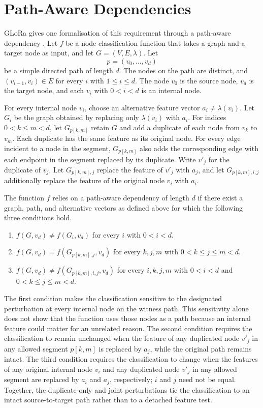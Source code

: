 \section{Path-Aware Dependencies}

GLoRa gives one formalisation of this requirement through a path-aware dependency \cite{zhou2025glora}.
Let \(f\) be a node-classification function that takes a graph and a target node as input, and let \(G=(V,E,\lambda)\).
Let
\[
p=(v_0,\ldots,v_d)
\]
be a simple directed path of length \(d\).
The nodes on the path are distinct, and \((v_{i-1},v_i)\in E\) for every \(i\) with \(1\leq i\leq d\).
The node \(v_0\) is the source node, \(v_d\) is the target node, and each \(v_i\) with \(0<i<d\) is an internal node.

For every internal node \(v_i\), choose an alternative feature vector \(a_i\neq\lambda(v_i)\).
Let \(G_i\) be the graph obtained by replacing only \(\lambda(v_i)\) with \(a_i\).
For indices \(0<k\leq m<d\), let \(G_{p[k,m]}\) retain \(G\) and add a duplicate of each node from \(v_k\) to \(v_m\).
Each duplicate has the same feature as its original node.
For every edge incident to a node in the segment, \(G_{p[k,m]}\) also adds the corresponding edge with each endpoint in the segment replaced by its duplicate.
Write \(v'_j\) for the duplicate of \(v_j\).
Let \(G_{p[k,m],j}\) replace the feature of \(v'_j\) with \(a_j\), and let \(G_{p[k,m],i,j}\) additionally replace the feature of the original node \(v_i\) with \(a_i\).

The function \(f\) relies on a path-aware dependency of length \(d\) if there exist a graph, path, and alternative vectors as defined above for which the following three conditions hold.
\begin{enumerate}
\item \(f(G,v_d)\neq f(G_i,v_d)\) for every \(i\) with \(0<i<d\).
\item \(f(G,v_d)=f(G_{p[k,m],j},v_d)\) for every \(k,j,m\) with \(0<k\leq j\leq m<d\).
\item \(f(G,v_d)\neq f(G_{p[k,m],i,j},v_d)\) for every \(i,k,j,m\) with \(0<i<d\) and \(0<k\leq j\leq m<d\).
\end{enumerate}

The first condition makes the classification sensitive to the designated perturbation at every internal node on the witness path.
This sensitivity alone does not show that the function uses those nodes as a path because an internal feature could matter for an unrelated reason.
The second condition requires the classification to remain unchanged when the feature of any duplicated node \(v'_j\) in any allowed segment \(p[k,m]\) is replaced by \(a_j\), while the original path remains intact.
The third condition requires the classification to change when the features of any original internal node \(v_i\) and any duplicated node \(v'_j\) in any allowed segment are replaced by \(a_i\) and \(a_j\), respectively; \(i\) and \(j\) need not be equal.
Together, the duplicate-only and joint perturbations tie the classification to an intact source-to-target path rather than to a detached feature test.

